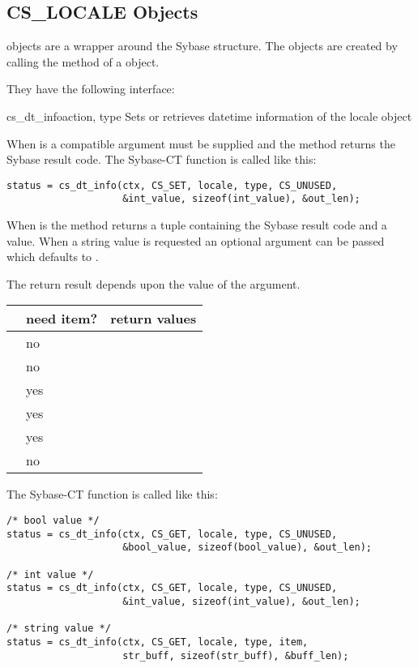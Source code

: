 \subsection{CS_LOCALE Objects}

 objects are a wrapper around the Sybase
 structure.  The objects are created by calling the
 method of a  object.

They have the following interface:

\begin{methoddesc}[CS_LOCALE]{cs_dt_info}{action, type \optional{, \ldots}}
Sets or retrieves datetime information of the locale object

When  is  a compatible  argument
must be supplied and the method returns the Sybase result code.  The
Sybase-CT  function is called like this:

\begin{verbatim}
status = cs_dt_info(ctx, CS_SET, locale, type, CS_UNUSED,
                    &int_value, sizeof(int_value), &out_len);
\end{verbatim}

When  is  the method returns a tuple
containing the Sybase result code and a value.  When a string value is
requested an optional  argument can be passed which defaults
to .

The return result depends upon the value of the  argument.

\begin{longtable}{l|l|l}
\var{type} & need item? & return values \\
\hline
\code{CS_12HOUR}     & no  & \code{status, bool} \\
\code{CS_DT_CONVFMT} & no  & \code{status, int} \\
\code{CS_MONTH}      & yes & \code{status, string} \\
\code{CS_SHORTMONTH} & yes & \code{status, string} \\
\code{CS_DAYNAME}    & yes & \code{status, string} \\
\code{CS_DATEORDER}  & no  & \code{status, string} \\
\end{longtable}

The Sybase-CT  function is called like this:

\begin{verbatim}
/* bool value */
status = cs_dt_info(ctx, CS_GET, locale, type, CS_UNUSED,
                    &bool_value, sizeof(bool_value), &out_len);

/* int value */
status = cs_dt_info(ctx, CS_GET, locale, type, CS_UNUSED,
                    &int_value, sizeof(int_value), &out_len);

/* string value */
status = cs_dt_info(ctx, CS_GET, locale, type, item,
                    str_buff, sizeof(str_buff), &buff_len);
\end{verbatim}
\end{methoddesc}

